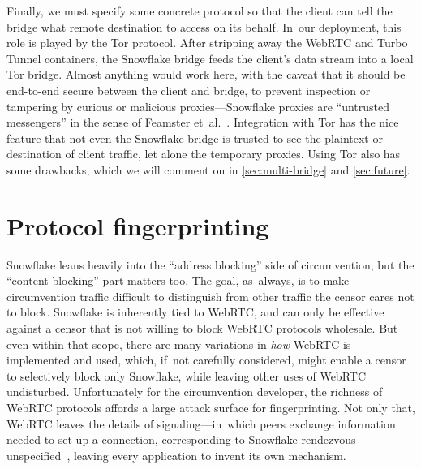 \documentclass[letterpaper,twocolumn]{article}
\begin{document}
Finally,
we must specify some concrete protocol
so that the client can tell the bridge
what remote destination to access on its behalf.
In~our deployment, this role is played by the Tor protocol.
After stripping away the WebRTC and Turbo Tunnel containers,
the Snowflake bridge feeds the client's data stream
into a local Tor bridge.
Almost anything would work here, with the caveat
that it should be end-to-end secure between the client and bridge,
to prevent inspection or tampering
by curious or malicious proxies---Snowflake proxies are ``untrusted messengers''
in the sense of
Feamster et~al.~\cite[\S 3]{Feamster2003a}.
Integration with Tor has the nice feature that
not even the Snowflake bridge is trusted
to see the plaintext or destination of client traffic,
let alone the temporary proxies.
Using Tor also has some drawbacks,
which we will comment on in
\autoref{sec:multi-bridge}
and
\autoref{sec:future}.

\section{Protocol fingerprinting}
\label{sec:fingerprinting}


Snowflake leans heavily into the ``address blocking'' side of circumvention,
but the ``content blocking'' part matters too.
The goal, as~always, is to make circumvention traffic
difficult to distinguish from other traffic the censor cares not to block.
Snowflake is inherently tied to WebRTC,
and can only be effective against a censor
that is not willing to block WebRTC protocols wholesale.
But even within that scope,
there are many variations in \emph{how}
WebRTC is implemented and used,
which, if~not carefully considered, might enable a censor
to selectively block only Snowflake,
while leaving other uses of WebRTC undisturbed.
Unfortunately for the circumvention developer,
the richness of WebRTC protocols
affords a large attack surface for fingerprinting.
Not only that, WebRTC leaves the details of
signaling---in~which peers exchange information
needed to set up a connection,
corresponding to Snowflake rendezvous---unspecified~\cite[\S 3]{rfc8825},
leaving every application to invent its own mechanism.
\end{document}
